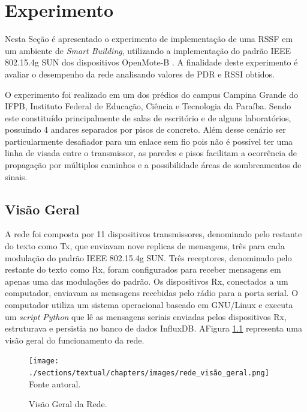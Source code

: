 \chapter{Experimento}
\label{experimento}

Nesta Seção é apresentado o experimento de implementação de uma RSSF em um ambiente de \emph{Smart Building}, utilizando a implementação do padrão IEEE 802.15.4g SUN dos dispositivos OpenMote-B \cite{tuset2020dataset}. A finalidade deste experimento é avaliar o desempenho da rede analisando valores de PDR e RSSI obtidos.

O experimento foi realizado em um dos prédios do campus Campina Grande do IFPB, Instituto Federal de Educação, Ciência e Tecnologia da Paraíba. Sendo este constituído principalmente de salas de escritório e de alguns laboratórios, possuindo 4 andares separados por pisos de concreto. Além desse cenário ser particularmente desafiador para um enlace sem fio pois não é possível ter uma linha de visada entre o transmissor, as paredes e pisos facilitam a ocorrência de propagação por múltiplos caminhos e a possibilidade áreas de sombreamentos de sinais.

\section{Visão Geral}
\label{subsec:visaogeral}
A rede foi composta por 11 dispositivos transmissores, denominado pelo restante do texto como Tx, que enviavam nove replicas de mensagens, três para cada modulação do padrão IEEE 802.15.4g SUN. Três receptores, denominado pelo restante do texto como Rx, foram configurados para receber mensagens em apenas uma das modulações do padrão. Os dispositivos Rx, conectados a um computador, enviavam as mensagens recebidas pelo rádio para a porta serial. O computador utiliza um sistema operacional baseado em GNU/Linux e executa um \emph{script Python} que lê as mensagens seriais enviadas pelos dispositivos Rx, estruturava e persistia no banco de dados InfluxDB. AFigura \ref{fig:rede_visão_geral} representa uma visão geral do funcionamento da rede.

\begin{figure}[h]
      \begin{center}
            \caption{Visão Geral da Rede.}
            \texttt{[image: ./sections/textual/chapters/images/rede\_visão\_geral.png]}\\
            Fonte autoral.
            \label{fig:rede_visão_geral}
      \end{center}
\end{figure}

